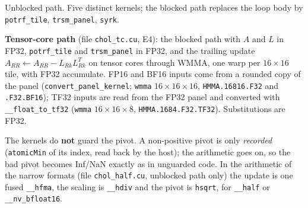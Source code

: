 \documentclass[11pt,a4paper]{article}
\begin{document}
\begin{center}

\small Unblocked path. Five distinct kernels; the blocked path replaces the loop body by \texttt{potrf\_tile}, \texttt{trsm\_panel}, \texttt{syrk}.
\end{center}

\textbf{Tensor-core path} (file \texttt{chol\_tc.cu}, E4): the blocked path with $A$ and $L$ in FP32, \texttt{potrf\_tile} and \texttt{trsm\_panel} in FP32, and the trailing update
$A_{RR}\leftarrow A_{RR}-L_{Rk}L_{Rk}^T$ on tensor cores through WMMA, one warp per $16\times16$ tile, with FP32 accumulate. FP16 and BF16 inputs come from a rounded copy of the panel
(\texttt{convert\_panel\_kernel}; \texttt{wmma} $16{\times}16{\times}16$, \texttt{HMMA.16816.F32} and \texttt{.F32.BF16}); TF32 inputs are read from the FP32 panel and converted with \texttt{\_\_float\_to\_tf32}
(\texttt{wmma} $16{\times}16{\times}8$, \texttt{HMMA.1684.F32.TF32}). Substitutions are FP32.

The kernels do \textbf{not} guard the pivot. A non-positive pivot is only \emph{recorded} (\texttt{atomicMin} of its index, read back by the host);
the arithmetic goes on, so the bad pivot becomes Inf/NaN exactly as in unguarded code. In the arithmetic of the narrow formats (file \texttt{chol\_half.cu}, unblocked path only)
the update is one fused \texttt{\_\_hfma}, the scaling is \texttt{\_\_hdiv} and the pivot is \texttt{hsqrt}, for \texttt{\_\_half} or \texttt{\_\_nv\_bfloat16}.
\end{document}
